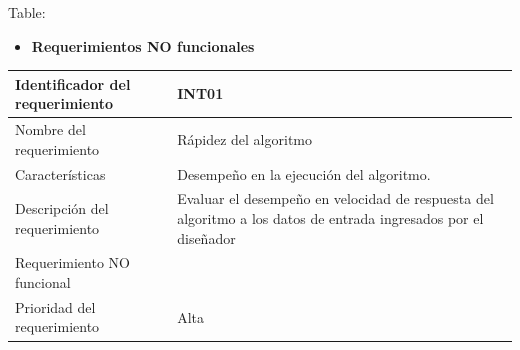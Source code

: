 \documentclass[]{article}
\providecommand{\tightlist}{%
  \setlength{\itemsep}{0pt}\setlength{\parskip}{0pt}}
\begin{document}
Table:

\begin{itemize}
\tightlist
\item
  \textbf{Requerimientos NO funcionales}
\end{itemize}

\begin{longtable}[]{@{}ll@{}}
\toprule
\begin{minipage}[b]{0.39\columnwidth}\raggedright\strut
Identificador del requerimiento\strut
\end{minipage} & \begin{minipage}[b]{0.50\columnwidth}\raggedright\strut
INT01\strut
\end{minipage}\tabularnewline
\midrule
\endhead
\begin{minipage}[t]{0.39\columnwidth}\raggedright\strut
Nombre del requerimiento\strut
\end{minipage} & \begin{minipage}[t]{0.50\columnwidth}\raggedright\strut
Rápidez del algoritmo\strut
\end{minipage}\tabularnewline
\begin{minipage}[t]{0.39\columnwidth}\raggedright\strut
Características\strut
\end{minipage} & \begin{minipage}[t]{0.50\columnwidth}\raggedright\strut
Desempeño en la ejecución del algoritmo.\strut
\end{minipage}\tabularnewline
\begin{minipage}[t]{0.39\columnwidth}\raggedright\strut
Descripción del requerimiento\strut
\end{minipage} & \begin{minipage}[t]{0.50\columnwidth}\raggedright\strut
Evaluar el desempeño en velocidad de respuesta del algoritmo a los datos
de entrada ingresados por el diseñador\strut
\end{minipage}\tabularnewline
\begin{minipage}[t]{0.39\columnwidth}\raggedright\strut
Requerimiento NO funcional\strut
\end{minipage} & \begin{minipage}[t]{0.50\columnwidth}\raggedright\strut
\strut
\end{minipage}\tabularnewline
\begin{minipage}[t]{0.39\columnwidth}\raggedright\strut
Prioridad del requerimiento\strut
\end{minipage} & \begin{minipage}[t]{0.50\columnwidth}\raggedright\strut
Alta\strut
\end{minipage}\tabularnewline
\bottomrule
\end{longtable}
\end{document}
